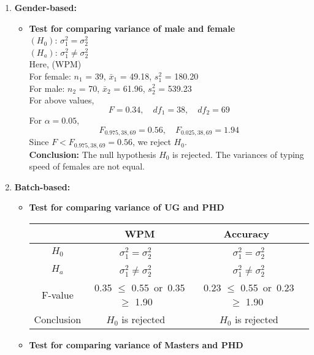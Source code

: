 \documentclass[12pt,a4paper]{report}
\begin{document}
\begin{enumerate}
    \item \textbf{Gender-based:}
    \begin{itemize}
        \item \textbf{Test for comparing variance of male and female}\\
        $(H_0)$: $\sigma_1^2 = \sigma_2^2$\\
        $(H_a)$: $\sigma_1^2 \neq \sigma_2^2$\\
        Here, (WPM)\\
        For female: $n_1$ = 39, $\bar{x}_1$ = 49.18, $s^2_1$ = 180.20 \\
        For male: $n_2$ = 70, $\bar{x}_2$ = 61.96, $s^2_2$ = 539.23 \\
        For above values,
        \[F = 0.34,\quad df_1 = 38,\quad df_2 = 69\]
        For $\alpha = 0.05$,
        \[F_{0.975, 38, 69} = 0.56, \quad F_{0.025, 38, 69} = 1.94\]
        Since $F<F_{0.975, 38, 69} = 0.56$, we reject $H_0$.\\
        \textbf{Conclusion:} The null hypothesis $H_0$ is rejected. The variances of typing speed of females are not equal.
    \end{itemize}
        \item \textbf{Batch-based:}
    \begin{itemize}
        \item \textbf{Test for comparing variance of UG and PHD}
        \begin{center}
        \begin{tabular}{ |c|c|c|c|}
          \hline
           & WPM & Accuracy \\
          \hline
          $H_0$ & $\sigma_1^2  = \sigma_2^2$ \ & \ $\sigma_1^2  = \sigma_2^2$ \\ 
          \hline
          $H_a$ & $\sigma_1^2  \neq \sigma_2^2$ \ & \ $\sigma_1^2  \neq \sigma_2^2$ \\
          \hline
          F-value &  0.35 $\leq$ 0.55\ or\  0.35 $\geq$ 1.90   \ & \ 0.23 $\leq$ 0.55\ or\  0.23 $\geq$ 1.90 \\
          \hline
          Conclusion & $H_0$ is rejected \ & \ $H_0$ is rejected\\
          \hline
        \end{tabular}
        \end{center}
        \newpage
        \item \textbf{Test for comparing variance of Masters and PHD}
        \begin{center}

\end{center}
\end{itemize}
\end{enumerate}
\end{document}
